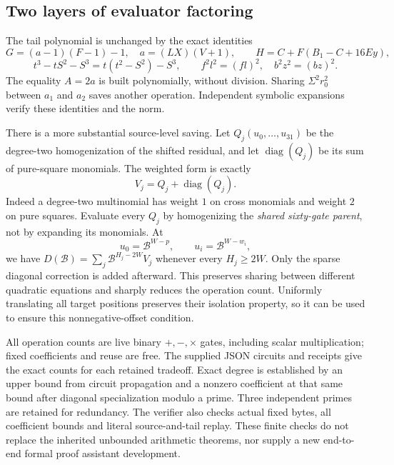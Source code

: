 \subsection{Two layers of evaluator factoring}
The tail polynomial is unchanged by the exact identities
\[
 G=(a-1)(F-1)-1,\quad a=(LX)(V+1),\qquad
 H=C+F(B_1-C+16Ey),
\]
\[
 t^3-tS^2-S^3=t(t^2-S^2)-S^3,
 \qquad f^2l^2=(fl)^2,\quad b^2z^2=(bz)^2.
\]
The equality $A=2a$ is built polynomially, without division. Sharing
$\Sigma^2r_0^2$ between $a_1$ and $a_2$ saves another operation.
Independent symbolic expansions verify these identities and the norm.

There is a more substantial source-level saving. Let
$Q_j(u_0,\ldots,u_{31})$ be the degree-two homogenization of the shifted
residual, and let $\operatorname{diag}(Q_j)$ be its sum of pure-square
monomials. The weighted form is exactly
\[
 V_j=Q_j+\operatorname{diag}(Q_j).
\]
Indeed a degree-two multinomial has weight $1$ on cross monomials and
weight $2$ on pure squares.  Evaluate every $Q_j$ by homogenizing the
\emph{shared sixty-gate parent}, not by expanding its monomials. At
\[
 u_0=\mathcal B^{W-p},\qquad
 u_i=\mathcal B^{W-w_i},
\]
we have
$D(\mathcal B)=\sum_j\mathcal B^{H_j-2W}V_j$ whenever every
$H_j\ge2W$.  Only the sparse diagonal correction is added afterward.
This preserves sharing between different quadratic equations and sharply
reduces the operation count. Uniformly translating all target positions
preserves their isolation property, so it can be used to ensure this
nonnegative-offset condition.

All operation counts are live binary $+,-,\times$ gates, including scalar
multiplication; fixed coefficients and reuse are free. The supplied JSON
circuits and receipts give the exact counts for each retained tradeoff.
Exact degree is established by an upper bound from circuit propagation
and a nonzero coefficient at that same bound after diagonal specialization
modulo a prime. Three independent primes are retained for redundancy.
The verifier also checks actual fixed bytes, all coefficient bounds and
literal source-and-tail replay. These finite checks do not replace the
inherited unbounded arithmetic theorems, nor supply a new end-to-end formal
proof assistant development.
